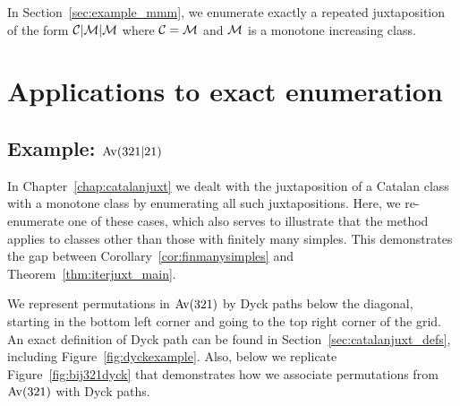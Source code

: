 \documentclass[12pt, a4paper, twoside]{report}
\begin{document}
In Section~\ref{sec:example_mmm}, we enumerate exactly a repeated juxtaposition of the form $\mathcal{C}|\mathcal{M}|\mathcal{M}$ where $\mathcal{C} = \mathcal{M}$ and $\mathcal{M}$ is a monotone increasing class. 

\section{Applications to exact enumeration}
\subsection{Example: $\mathrm{Av}(321|21)$}
\label{sec:example_Av321Av21}

In Chapter~\ref{chap:catalanjuxt} we dealt with the juxtaposition of a Catalan class with a monotone class by enumerating all such juxtapositions. Here, we re-enumerate one of these cases, which also serves to illustrate that the method applies to classes other than those with finitely many simples. This demonstrates the gap between Corollary~\ref{cor:finmanysimples} and Theorem~\ref{thm:iterjuxt_main}.

We represent permutations in $\mathrm{Av}(321)$ by Dyck paths below the diagonal, starting in the bottom left corner and going to the top right corner of the grid. An exact definition of Dyck path can be found in Section~\ref{sec:catalanjuxt_defs}, including Figure~\ref{fig:dyckexample}. Also, below we replicate Figure~\ref{fig:bij321dyck} that demonstrates how we associate permutations from $\mathrm{Av}(321)$ with Dyck paths.
\end{document}
